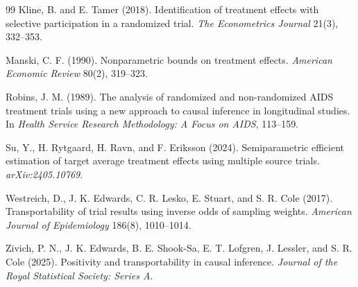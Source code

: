 \documentclass[11pt]{article}
\theoremstyle{definition}
\theoremstyle{plain}
\theoremstyle{remark}
\begin{document}
\begin{thebibliography}{99}
Kline, B. and E. Tamer (2018).
\newblock Identification of treatment effects with selective participation in a randomized trial.
\newblock \emph{The Econometrics Journal} 21(3), 332--353.

Manski, C. F. (1990).
\newblock Nonparametric bounds on treatment effects.
\newblock \emph{American Economic Review} 80(2), 319--323.

Robins, J. M. (1989).
\newblock The analysis of randomized and non-randomized AIDS treatment trials using a new approach to causal inference in longitudinal studies.
\newblock In \emph{Health Service Research Methodology: A Focus on AIDS}, 113--159.

Su, Y., H. Rytgaard, H. Ravn, and F. Eriksson (2024).
\newblock Semiparametric efficient estimation of target average treatment effects using multiple source trials.
\newblock \emph{arXiv:2405.10769}.

Westreich, D., J. K. Edwards, C. R. Lesko, E. Stuart, and S. R. Cole (2017).
\newblock Transportability of trial results using inverse odds of sampling weights.
\newblock \emph{American Journal of Epidemiology} 186(8), 1010--1014.

Zivich, P. N., J. K. Edwards, B. E. Shook-Sa, E. T. Lofgren, J. Lessler, and S. R. Cole (2025).
\newblock Positivity and transportability in causal inference.
\newblock \emph{Journal of the Royal Statistical Society: Series A}.
\end{thebibliography}
\end{document}
